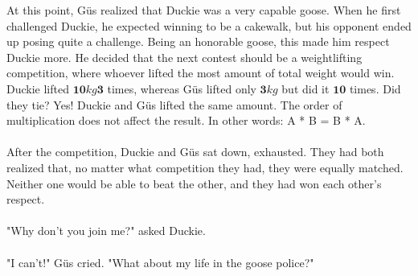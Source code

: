 {}
{At this point, Güs realized that Duckie was a very capable goose. When he first challenged Duckie, he expected winning to be a cakewalk, but his opponent ended up posing quite a challenge. Being an honorable goose, this made him respect Duckie more. He decided that the next contest should be a weightlifting competition, where whoever lifted the most amount of total weight would win. Duckie lifted $\textbf{10} kg  \textbf{3}$ times, whereas Güs lifted only $\textbf{3} kg$ but did it $\textbf{10}$ times. Did they tie?}
{Yes! Duckie and Güs lifted the same amount.}
{The order of multiplication does not affect the result. In other words: A * B = B * A.}
{}
\paragraph{} After the competition, Duckie and Güs sat down, exhausted. They had both realized that, no matter what competition they had, they were equally matched. Neither one would be able to beat the other, and they had won each other's respect. 
\paragraph{} "Why don't you join me?" asked Duckie.
\paragraph{} "I can't!" Güs cried. "What about my life in the goose police?"
